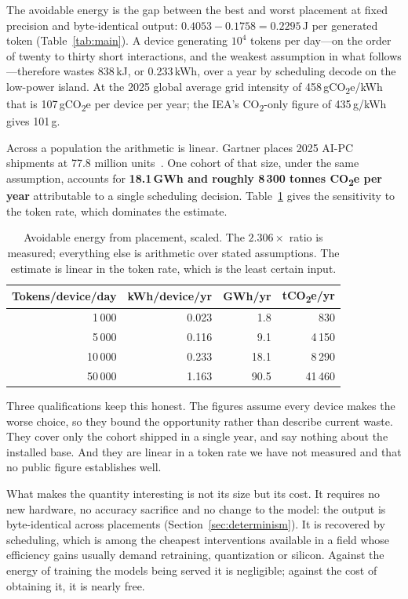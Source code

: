 \documentclass[journal]{IEEEtran}
\begin{document}
The avoidable energy is the gap between the best and worst placement at fixed
precision and byte-identical output: $0.4053 - 0.1758 = 0.2295$\,J per
generated token (Table~\ref{tab:main}). A device generating
$10^{4}$ tokens per day---on the order of twenty to thirty short interactions,
and the weakest assumption in what follows---therefore wastes 838\,kJ, or
0.233\,kWh, over a year by scheduling decode on the low-power island. At the
2025 global average grid intensity of 458\,gCO\textsubscript{2}e/kWh~\cite{ember2026review}
that is 107\,gCO\textsubscript{2}e per device per year; the IEA's
CO\textsubscript{2}-only figure of 435\,g/kWh~\cite{iea2026electricity} gives
101\,g.

Across a population the arithmetic is linear. Gartner places 2025 AI-PC
shipments at 77.8 million units~\cite{gartner2025aipc}. One cohort of that size,
under the same assumption, accounts for \textbf{18.1\,GWh and roughly
8\,300 tonnes CO\textsubscript{2}e per year} attributable to a single
scheduling decision. Table~\ref{tab:scale} gives the sensitivity to the token
rate, which dominates the estimate.

\begin{table}[t]
\centering
\caption{Avoidable energy from placement, scaled. The $2.306\times$ ratio is
measured; everything else is arithmetic over stated assumptions. The estimate
is linear in the token rate, which is the least certain input.}
\label{tab:scale}
\begin{tabular}{rrrr}
\toprule
Tokens/device/day & kWh/device/yr & GWh/yr & tCO\textsubscript{2}e/yr \\
\midrule
1\,000  & 0.023 & 1.8  & 830 \\
5\,000  & 0.116 & 9.1  & 4\,150 \\
10\,000 & 0.233 & 18.1 & 8\,290 \\
50\,000 & 1.163 & 90.5 & 41\,460 \\
\bottomrule
\end{tabular}
\end{table}

Three qualifications keep this honest. The figures assume every device makes
the worse choice, so they bound the opportunity rather than describe current
waste. They cover only the cohort shipped in a single year, and say nothing
about the installed base. And they are linear in a token rate we have not
measured and that no public figure establishes well.

What makes the quantity interesting is not its size but its cost. It requires
no new hardware, no accuracy sacrifice and no change to the model: the output
is byte-identical across placements (Section~\ref{sec:determinism}). It is
recovered by scheduling, which is among the cheapest interventions available in
a field whose efficiency gains usually demand retraining, quantization or
silicon. Against the energy of training the models being served it is
negligible; against the cost of obtaining it, it is nearly free.
\end{document}
